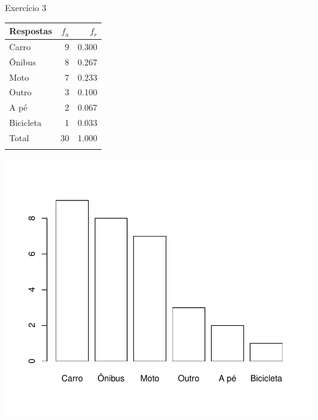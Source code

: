 \documentclass[
  ignorenonframetext,
  serif,
  professionalfont,
  usenames,
  dvipsnames,
  aspectratio = 169]{beamer}
\def\beginAHalfColumn{\begin{minipage}{0.49\textwidth}}%
\def\endColumns{\end{minipage}}%
\begin{document}
\begin{frame}{Exercício 3}
\label{exercuxedcio-3-3}
\beginAHalfColumn

\begin{longtable}[]{@{}lrr@{}}
\toprule\noalign{}
Respostas & \(f_a\) & \(f_r\) \\
\midrule\noalign{}
\endhead
Carro & 9 & 0.300 \\
Ônibus & 8 & 0.267 \\
Moto & 7 & 0.233 \\
Outro & 3 & 0.100 \\
A pé & 2 & 0.067 \\
Bicicleta & 1 & 0.033 \\
Total & 30 & 1.000 \\
\bottomrule\noalign{}
\end{longtable}

\endColumns
\beginAHalfColumn

\begin{center}\includegraphics[width=0.9\linewidth]{exercicios-encontro1-solucao_files/figure-beamer/unnamed-chunk-6-1} \end{center}

\endColumns
\end{frame}
\end{document}
